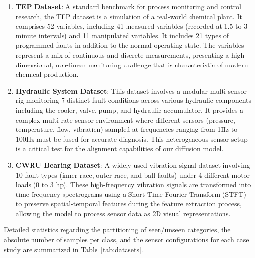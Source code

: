 \begin{enumerate}
    \item \textbf{TEP Dataset}: A standard benchmark for process monitoring and control research, the TEP dataset is a simulation of a real-world chemical plant. It comprises 52 variables, including 41 measured variables (recorded at 1.5 to 3-minute intervals) and 11 manipulated variables. It includes 21 types of programmed faults in addition to the normal operating state. The variables represent a mix of continuous and discrete measurements, presenting a high-dimensional, non-linear monitoring challenge that is characteristic of modern chemical production.
    \item \textbf{Hydraulic System Dataset}: This dataset involves a modular multi-sensor rig monitoring 7 distinct fault conditions across various hydraulic components including the cooler, valve, pump, and hydraulic accumulator. It provides a complex multi-rate sensor environment where different sensors (pressure, temperature, flow, vibration) sampled at frequencies ranging from 1Hz to 100Hz must be fused for accurate diagnosis. This heterogeneous sensor setup is a critical test for the alignment capabilities of our diffusion model.
    \item \textbf{CWRU Bearing Dataset}: A widely used vibration signal dataset involving 10 fault types (inner race, outer race, and ball faults) under 4 different motor loads (0 to 3 hp). These high-frequency vibration signals are transformed into time-frequency spectrograms using a Short-Time Fourier Transform (STFT) to preserve spatial-temporal features during the feature extraction process, allowing the model to process sensor data as 2D visual representations.
\end{enumerate}
Detailed statistics regarding the partitioning of seen/unseen categories, the absolute number of samples per class, and the sensor configurations for each case study are summarized in Table~\ref{tab:datasets}.

